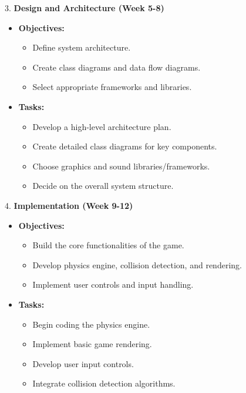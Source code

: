 \documentclass[
]{article}
\begin{document}
3. \textbf{Design and Architecture (Week 5-8)}

\begin{itemize}
\item
  \textbf{Objectives:}

  \begin{itemize}
  \item
    Define system architecture.
  \item
    Create class diagrams and data flow diagrams.
  \item
    Select appropriate frameworks and libraries.
  \end{itemize}
\item
  \textbf{Tasks:}

  \begin{itemize}
  \item
    Develop a high-level architecture plan.
  \item
    Create detailed class diagrams for key components.
  \item
    Choose graphics and sound libraries/frameworks.
  \item
    Decide on the overall system structure.
  \end{itemize}
\end{itemize}

4. \textbf{Implementation (Week 9-12)}

\begin{itemize}
\item
  \textbf{Objectives:}

  \begin{itemize}
  \item
    Build the core functionalities of the game.
  \item
    Develop physics engine, collision detection, and rendering.
  \item
    Implement user controls and input handling.
  \end{itemize}
\item
  \textbf{Tasks:}

  \begin{itemize}
  \item
    Begin coding the physics engine.
  \item
    Implement basic game rendering.
  \item
    Develop user input controls.
  \item
    Integrate collision detection algorithms.
  \end{itemize}
\end{itemize}
\end{document}
